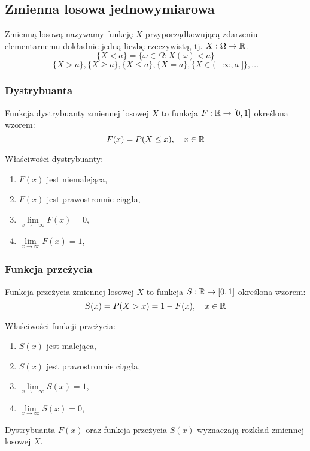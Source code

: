 \documentclass[../Matematyka.tex]{subfiles}
\begin{document}
\subsection{Zmienna losowa jednowymiarowa}
Zmienną losową nazywamy funkcję \(X\) przyporządkowującą zdarzeniu elementarnemu dokładnie jedną liczbę rzeczywistą,
tj. \(X : \Omega \rightarrow \mathbb{R}\).
\[ \{X < a\} = \{\omega \in \Omega : X(\omega) < a\} \]
\[ \{X > a\}, \{X \geq a\}, \{X \leq a\}, \{X = a\}, \{X \in (-\infty, a\;]\}, \ldots \]

\begin{multicols}{2}
    \setlength{\columnseprule}{1pt}
    \subsubsection*{Dystrybuanta}
    Funkcja dystrybuanty zmiennej losowej \(X\) to funkcja \(F : \mathbb{R} \rightarrow [0, 1]\) określona wzorem:
    \[F(x) = P(X \leq x), \quad x \in \mathbb{R}\]

    Właściwości dystrybuanty:
    \begin{enumerate}[label=(\roman*)]
        \item \(F(x)\) jest niemalejąca,
        \item \(F(x)\) jest prawostronnie ciągła,
        \item \(\lim\limits_{x \to -\infty} F(x) = 0\),
        \item \(\lim\limits_{x \to \infty} F(x) = 1\),
    \end{enumerate}

    \subsubsection*{Funkcja przeżycia}
    Funkcja przeżycia zmiennej losowej \(X\) to funkcja \(S : \mathbb{R} \rightarrow [0, 1]\) określona wzorem:
    \[S(x) = P(X > x) = 1 - F(x), \quad x \in \mathbb{R}\]

    Właściwości funkcji przeżycia:
    \begin{enumerate}[label=(\roman*)]
        \item \(S(x)\) jest malejąca,
        \item \(S(x)\) jest prawostronnie ciągła,
        \item \(\lim\limits_{x \to -\infty} S(x) = 1\),
        \item \(\lim\limits_{x \to \infty} S(x) = 0\),
    \end{enumerate}
\end{multicols}
Dystrybuanta \(F(x)\) oraz funkcja przeżycia \(S(x)\) wyznaczają rozkład zmiennej losowej \(X\).
\end{document}
